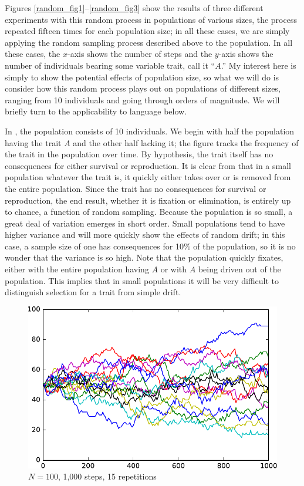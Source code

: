 \documentclass[output=paper]{langsci/langscibook}
\begin{document}
Figures \ref{random_fig1}--\ref{random_fig3} show the results of three
different experiments with this random process in populations of
various sizes, the process repeated fifteen times for each population
size; in all these cases, we are simply applying the random sampling
process described above to the population.  In all these cases, the
$x$-axis shows the number of steps and the $y$-axis shows the
number of individuals bearing some variable trait, call it
``$A$.''  My interest here is simply to show the potential effects of
population size, so what we will do is consider how this random
process plays out on populations of different sizes, ranging from 10
individuals and going through orders of magnitude.  We will briefly
turn to the applicability to language below.

In , the population consists of 10 individuals.
We begin with half the population having the trait $A$ and the other
half lacking it; the figure tracks the frequency of the trait in the
population over time.  By hypothesis, the trait itself has no
consequences for either survival or reproduction.  It is clear from
 that in a small population whatever the trait
is, it quickly either takes over or is removed from the entire
population.  Since the trait has no consequences for survival or
reproduction, the end result, whether it is fixation or elimination,
is entirely up to chance, a function of random sampling.  Because the
population is so small, a great deal of variation emerges in short
order.  Small populations tend to have higher variance and will more
quickly show the effects of random drift; in this case, a sample size
of one has consequences for 10\% of the population, so it is no wonder
that the variance is so high.  Note that the population quickly
fixates, either with the entire population having $A$ or with $A$
being driven out of the population.  This implies that in small
populations it will be very difficult to distinguish selection for a
trait from simple drift.

\begin{figure}
    \includegraphics[width=.75\linewidth]{img/pop100_1000.pdf}
    \caption{$N=100$, 1,000 steps, 15 repetitions\label{random_fig2}}
\end{figure}
\end{document}
